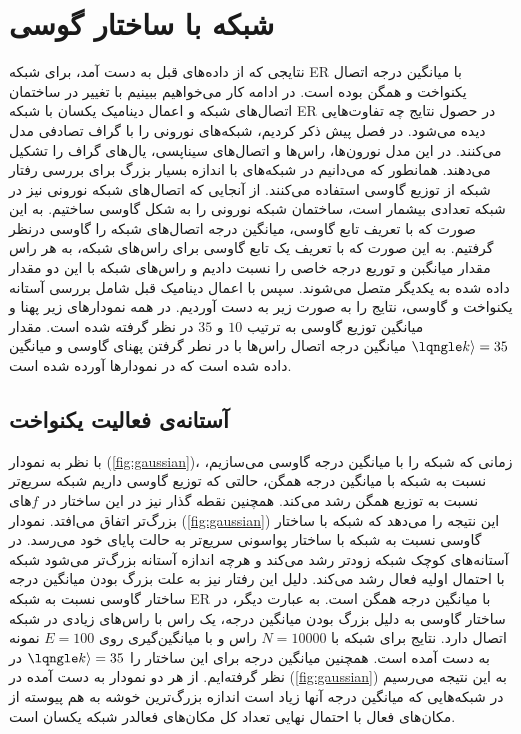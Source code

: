 \section{شبکه با ساختار گوسی}
نتایجی که از داده‌های قبل به دست آمد، برای شبکه ER با میانگین درجه اتصال یکنواخت و همگن بوده است. در ادامه کار می‌خواهیم ببینیم با تغییر در ساختمان اتصال‌های شبکه و اعمال دینامیک یکسان با شبکه‌ ER در حصول نتایج چه تفاوت‌هایی دیده می‌شود. در فصل پیش  ذکر کردیم، شبکه‌های نورونی را با گراف تصادفی مدل می‌کنند. در این مدل نورون‌ها، راس‌ها و اتصال‌های سیناپسی، یال‌های گراف را تشکیل می‌دهند. همانطور که می‌دانیم در شبکه‌های با  اندازه  بسیار بزرگ  برای  بررسی رفتار شبکه از توزیع گاوسی استفاده می‌کنند. از آنجایی که  اتصال‌های شبکه نورونی  نیز در شبکه تعدادی بیشمار  است، ساختمان شبکه نورونی را به شکل  گاوسی ساختیم. به این صورت که با تعریف تابع گاوسی، میانگین درجه اتصال‌های شبکه را گاوسی  درنظر گرفتیم. به این صورت که با تعریف یک تابع گاوسی برای راس‌های شبکه، به هر راس  مقدار میانگبن و توریع درجه خاصی را نسبت دادیم و راس‌های شبکه با این دو مقدار داده شده به  یکدیگر متصل می‌شوند. سپس  با اعمال  دینامیک قبل شامل بررسی آستانه یکنواخت و گاوسی، ‌نتایج را به صورت زیر به دست آوردیم. در همه نمودار‌های زیر پهنا و  میانگین  توزیع گاوسی به ترتیب $10$ و $35 $ در نظر گرفته شده است. مقدار $\lqngle k \rangle = 35$  میانگین درجه اتصال‌ راس‌ها با در نطر گرفتن پهنای گاوسی و میانگین داده شده است که در نمودار‌ها آورده شده است.

\subsection{آستانه‌ی فعالیت یکنواخت}
 با نظر به نمودار (\ref{fig:gaussian})، زمانی که شبکه را با  میانگین درجه گاوسی  می‌سازیم، نسبت به شبکه با میانگین درجه همگن،‌  حالتی که توزیع گاوسی داریم شبکه سریع‌تر نسبت به توزیع همگن رشد می‌کند. همچنین نقطه گذار نیز در این ساختار در $f$های بزرگ‌تر اتفاق می‌افتد.  
 نمودار (\ref{fig:gaussian})  این نتیجه را می‌دهد که شبکه با ساختار گاوسی نسبت به شبکه با ساختار پواسونی سریع‌تر به حالت پایای خود می‌رسد. در آستانه‌های کوچک شبکه زود‌تر رشد می‌کند و هرچه اندازه آستانه بزرگ‌تر می‌شود شبکه با احتمال اولیه فعال رشد می‌کند.
 دلیل این رفتار نیز به علت بزرگ بودن میانگین درجه ساختار گاوسی نسبت به شبکه ER با میانگین درجه همگن است. به عبارت دیگر، در ساختار گاوسی به دلیل بزرگ بودن میانگین درجه، یک راس با راس‌های زیادی در شبکه اتصال دارد. نتایج برای شبکه با $N=10000$ راس و با میانگین‌گیری روی $E=100$  نمونه به دست آمده است. همچنین میانگین درجه برای این ساختار را $\lqngle k \rangle = 35$  در نظر گرفته‌ایم. از هر دو نمودار به دست آمده در (\ref{fig:gaussian}) به این نتیجه می‌رسیم در شبکه‌هایی که میانگین درجه آنها زیاد است اندازه بزرگ‌ترین خوشه به هم پیوسته از مکان‌های فعال با احتمال نهایی تعداد کل مکان‌های فعالدر شبکه یکسان است. 
 

